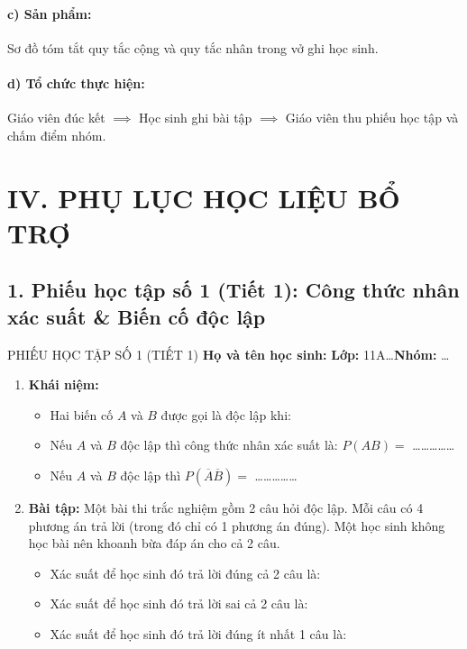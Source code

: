 \documentclass[12pt, a4paper]{article}
\begin{document}
\paragraph{c) Sản phẩm:} Sơ đồ tóm tắt quy tắc cộng và quy tắc nhân trong vở ghi học sinh.

\paragraph{d) Tổ chức thực hiện:} Giáo viên đúc kết $\implies$ Học sinh ghi bài tập $\implies$ Giáo viên thu phiếu học tập và chấm điểm nhóm.

\section*{IV. PHỤ LỤC HỌC LIỆU BỔ TRỢ}

\subsection*{1. Phiếu học tập số 1 (Tiết 1): Công thức nhân xác suất \& Biến cố độc lập}

\begin{pedabox}{PHIẾU HỌC TẬP SỐ 1 (TIẾT 1)}
\textbf{Họ và tên học sinh:} \dotfill \textbf{Lớp:} 11A\dots \quad \textbf{Nhóm:} \dots
\begin{enumerate}[leftmargin=0.6cm]
    \item \textbf{Khái niệm:}
    \begin{itemize}
        \item Hai biến cố $A$ và $B$ được gọi là độc lập khi: \dotfill
        \item Nếu $A$ và $B$ độc lập thì công thức nhân xác suất là: $P(AB) = $ \dots\dots\dots\dots\dots
        \item Nếu $A$ và $B$ độc lập thì $P(\overline{A}\overline{B}) = $ \dots\dots\dots\dots\dots
    \end{itemize}
    \item \textbf{Bài tập:} Một bài thi trắc nghiệm gồm 2 câu hỏi độc lập. Mỗi câu có 4 phương án trả lời (trong đó chỉ có 1 phương án đúng). Một học sinh không học bài nên khoanh bừa đáp án cho cả 2 câu.
    \begin{itemize}
        \item Xác suất để học sinh đó trả lời đúng cả 2 câu là: \dotfill
        \item Xác suất để học sinh đó trả lời sai cả 2 câu là: \dotfill
        \item Xác suất để học sinh đó trả lời đúng ít nhất 1 câu là: \dotfill
    \end{itemize}
\end{enumerate}
\end{pedabox}
\end{document}
